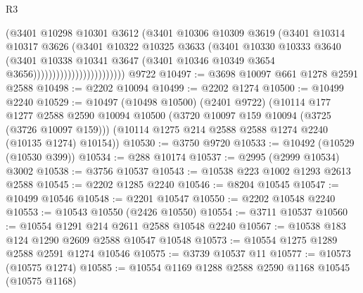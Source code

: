 \begin{lexlean}{R3}
\begin{coremodule}
                                      (@3401
                                        @10298
                                        @10301
                                        @3612
                                        (@3401
                                          @10306
                                          @10309
                                          @3619
                                          (@3401
                                            @10314
                                            @10317
                                            @3626
                                            (@3401
                                              @10322
                                              @10325
                                              @3633
                                              (@3401
                                                @10330
                                                @10333
                                                @3640
                                                (@3401
                                                  @10338
                                                  @10341
                                                  @3647
                                                  (@3401
                                                    @10346
                                                    @10349
                                                    @3654
                                                    @3656))))))))))))))))))))))))
    @9722
@10497 := @3698 @10097 @661 @1278 @2591 @2588
@10498 := @2202 @10094
@10499 := @2202 @1274
@10500 := @10499 @2240
@10529 := @10497
    (@10498 @10500)
    (@2401 @9722)
    (@10114
      @177
      @1277
      @2588
      @2590
      @10094
      @10500
      (@3720 @10097 @159 @10094 (@3725 (@3726 @10097 @159)))
      (@10114 @1275 @214 @2588 @2588 @1274 @2240 (@10135 @1274) @10154))
@10530 := @3750 @9720
@10533 := @10492 (@10529 (@10530 @399))
@10534 := @288 @10174
@10537 := @2995 (@2999 @10534) @3002
@10538 := @3756 @10537
@10543 := @10538 @223 @1002 @1293 @2613 @2588
@10545 := @2202 @1285 @2240
@10546 := @8204 @10545
@10547 := @10499 @10546
@10548 := @2201 @10547
@10550 := @2202 @10548 @2240
@10553 := @10543 @10550 (@2426 @10550)
@10554 := @3711 @10537
@10560 := @10554 @1291 @214 @2611 @2588 @10548 @2240
@10567 := @10538 @183 @124 @1290 @2609 @2588 @10547 @10548
@10573 := @10554 @1275 @1289 @2588 @2591 @1274 @10546
@10575 := @3739 @10537 @11
@10577 := @10573 (@10575 @1274)
@10585 := @10554 @1169 @1288 @2588 @2590 @1168 @10545 (@10575 @1168)

\end{coremodule}
\end{lexlean}
